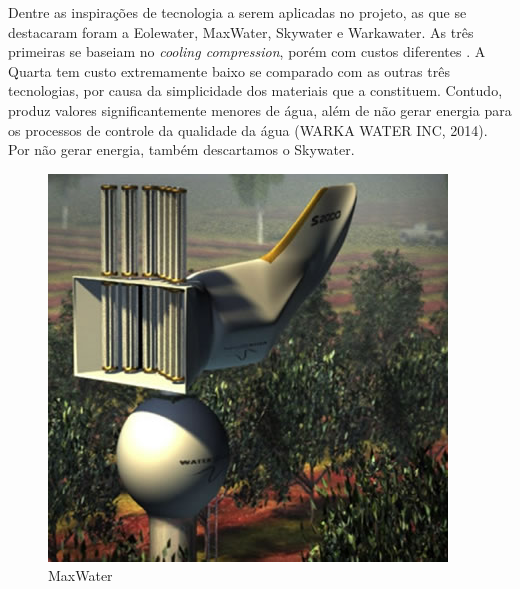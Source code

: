 % 
% 
% 
% 
% 
 
Dentre as inspirações de tecnologia a serem aplicadas no projeto, as que se destacaram foram a Eolewater, MaxWater, Skywater
e Warkawater. As três primeiras se baseiam no \emph{cooling compression}, porém com custos
diferentes \cite{eole} \cite{whisson}.
A Quarta tem custo extremamente baixo se comparado com as outras três tecnologias, por causa da simplicidade dos
materiais que a constituem. Contudo, produz valores significantemente menores de água, além de não gerar energia
para os processos de controle da qualidade da água (WARKA WATER INC, 2014). Por não gerar energia, também descartamos o Skywater.

\begin{figure}[!ht]
\centering
\includegraphics[scale=0.6]{editaveis/figuras/max_water}
\caption[MaxWater]{MaxWater\footnotemark}

\label{max_water_turbina}
\end{figure}

